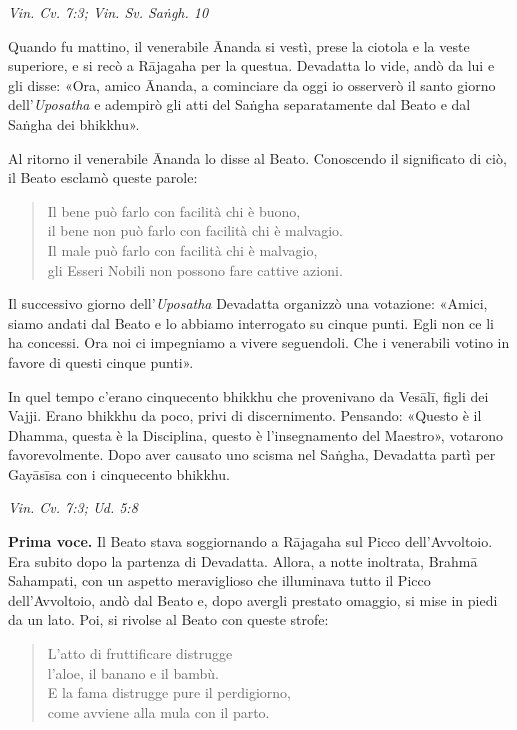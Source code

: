 \emph{Vin. Cv. 7:3; Vin. Sv. Saṅgh. 10}


Quando fu mattino, il venerabile Ānanda si vestì, prese la ciotola e la
veste superiore, e si recò a Rājagaha per la questua. Devadatta lo vide,
andò da lui e gli disse: «Ora, amico Ānanda, a cominciare da oggi io
osserverò il santo giorno dell’\emph{Uposatha} e adempirò gli atti del Saṅgha
separatamente dal Beato e dal Saṅgha dei bhikkhu».


Al ritorno il venerabile Ānanda lo disse al Beato. Conoscendo il
significato di ciò, il Beato esclamò queste parole:


\begin{quotation}
Il bene può farlo con facilità chi è buono, \\
il bene non può farlo con facilità chi è malvagio. \\
Il male può farlo con facilità chi è malvagio, \\
gli Esseri Nobili non possono fare cattive azioni.
\end{quotation}

Il successivo giorno dell’\emph{Uposatha} Devadatta organizzò una votazione:
«Amici, siamo andati dal Beato e lo abbiamo interrogato su cinque punti.
Egli non ce li ha concessi. Ora noi ci impegniamo a vivere seguendoli.
Che i venerabili votino in favore di questi cinque punti».


In quel tempo c’erano cinquecento bhikkhu che provenivano da Vesālī,
figli dei Vajji. Erano bhikkhu da poco, privi di discernimento.
Pensando: «Questo è il Dhamma, questa è la Disciplina, questo è
l’insegnamento del Maestro», votarono favorevolmente. Dopo aver causato
uno scisma nel Saṅgha, Devadatta partì per Gayāsīsa con i cinquecento
bhikkhu.


\emph{Vin. Cv. 7:3; Ud. 5:8}


\textbf{Prima voce.} Il Beato stava soggiornando a Rājagaha sul Picco
dell’Avvoltoio. Era subito dopo la partenza di Devadatta. Allora, a
notte inoltrata, Brahmā Sahampati, con un aspetto meraviglioso che
illuminava tutto il Picco dell’Avvoltoio, andò dal Beato e, dopo avergli
prestato omaggio, si mise in piedi da un lato. Poi, si rivolse al Beato
con queste strofe:


\begin{quotation}
L’atto di fruttificare distrugge \\
l’aloe, il banano e il bambù. \\
E la fama distrugge pure il perdigiorno, \\
come avviene alla mula con il parto.
\end{quotation}

